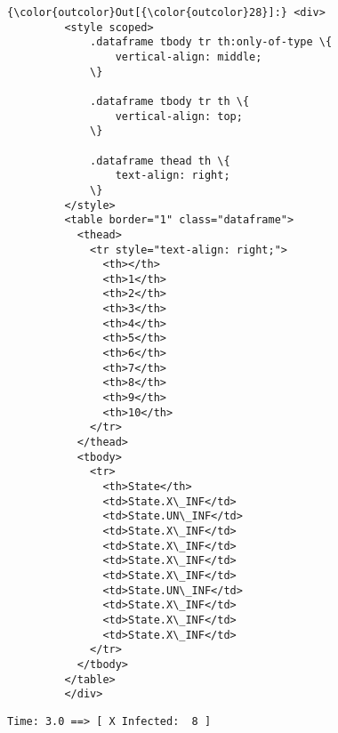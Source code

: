 \documentclass[11pt]{article}
\begin{document}
\begin{Verbatim}[commandchars=\\\{\}]
{\color{outcolor}Out[{\color{outcolor}28}]:} <div>
         <style scoped>
             .dataframe tbody tr th:only-of-type \{
                 vertical-align: middle;
             \}
         
             .dataframe tbody tr th \{
                 vertical-align: top;
             \}
         
             .dataframe thead th \{
                 text-align: right;
             \}
         </style>
         <table border="1" class="dataframe">
           <thead>
             <tr style="text-align: right;">
               <th></th>
               <th>1</th>
               <th>2</th>
               <th>3</th>
               <th>4</th>
               <th>5</th>
               <th>6</th>
               <th>7</th>
               <th>8</th>
               <th>9</th>
               <th>10</th>
             </tr>
           </thead>
           <tbody>
             <tr>
               <th>State</th>
               <td>State.X\_INF</td>
               <td>State.UN\_INF</td>
               <td>State.X\_INF</td>
               <td>State.X\_INF</td>
               <td>State.X\_INF</td>
               <td>State.X\_INF</td>
               <td>State.UN\_INF</td>
               <td>State.X\_INF</td>
               <td>State.X\_INF</td>
               <td>State.X\_INF</td>
             </tr>
           </tbody>
         </table>
         </div>
\end{Verbatim}
            
    \begin{Verbatim}[commandchars=\\\{\}]
Time: 3.0 ==> [ X Infected:  8 ] 


    \end{Verbatim}
\end{document}
